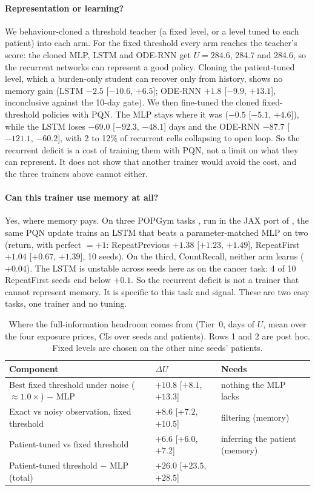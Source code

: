 \documentclass[10pt]{article}
\renewcommand{\cite}{\citep}  %
\begin{document}
\paragraph{Representation or learning?} We behaviour-cloned a threshold teacher
(a fixed level, or a level tuned to each patient) into each arm. For the fixed
threshold every arm reaches the teacher's score: the cloned MLP, LSTM and
ODE-RNN get $U=284.6$, 284.7 and 284.6, so the recurrent networks can represent
a good policy. Cloning the patient-tuned level, which a burden-only student can
recover only from history, shows no memory gain (LSTM $-2.5$ [$-10.6$, $+6.5$];
ODE-RNN $+1.8$ [$-9.9$, $+13.1$], inconclusive against the 10-day gate). We then
fine-tuned the cloned fixed-threshold policies with PQN. The MLP stays where it
was ($-0.5$ [$-5.1$, $+4.6$]), while the LSTM loses $-69.0$ [$-92.3$, $-48.1$]
days and the ODE-RNN $-87.7$ [$-121.1$, $-60.2$], with 2 to 12\% of recurrent
cells collapsing to open loop. So the recurrent deficit is a cost of training
them with PQN, not a limit on what they can represent. It does not show that
another trainer would avoid the cost, and the three trainers above cannot either.

\paragraph{Can this trainer use memory at all?} Yes, where memory pays. On
three POPGym tasks \cite{morad2023}, run in the JAX port of \citet{lu2023}, the
same PQN update trains an LSTM that beats a parameter-matched MLP on two (return,
with perfect $=+1$: RepeatPrevious $+1.38$ [$+1.23$, $+1.49$], RepeatFirst
$+1.04$ [$+0.67$, $+1.39$], 10 seeds). On the third, CountRecall, neither arm
learns ($+0.04$). The LSTM is unstable across seeds here as on the cancer task:
4 of 10 RepeatFirst seeds end below $+0.1$. So the recurrent deficit is not a
trainer that cannot represent memory. It is specific to this task and signal.
These are two easy tasks, one trainer and no tuning. %

\begin{table}[t]
\centering\footnotesize
\caption{Where the full-information headroom comes from (Tier~0, days of $U$,
mean over the four exposure prices, CIs over seeds and patients). Rows 1 and 2
are post hoc. Fixed levels are chosen on the other nine seeds' patients.}
\label{tab:split}
\begin{tabular}{@{}lll@{}}
\toprule
Component & $\Delta U$ & Needs \\
\midrule
Best fixed threshold under noise ($\approx 1.0\times$) $-$ MLP & $+10.8$ [$+8.1$, $+13.3$] & nothing the MLP lacks \\
Exact vs noisy observation, fixed threshold & $+8.6$ [$+7.2$, $+10.5$] & filtering (memory) \\
Patient-tuned vs fixed threshold & $+6.6$ [$+6.0$, $+7.2$] & inferring the patient (memory) \\
\midrule
Patient-tuned threshold $-$ MLP (total) & $+26.0$ [$+23.5$, $+28.5$] & \\
\bottomrule
\end{tabular}
\end{table}
\end{document}
